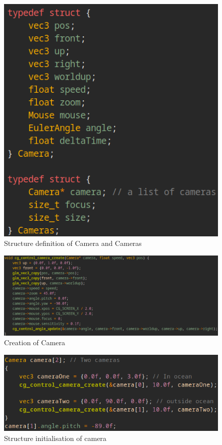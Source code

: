 \documentclass[a4paper, 10pt]{article}
\begin{document}
\begin{figure}[h]
    \centering
    \includegraphics[scale=0.8]{images/camera-struct}
    \caption{Structure definition of Camera and Cameras}
    \label{fig:camera-struct}
\end{figure}

\begin{figure}[h]
    \centering
    \includegraphics[scale=0.5]{images/camera-create-2}
    \caption{Creation of Camera}
    \label{fig:camera-create-2}
\end{figure}

\begin{figure}[h]
    \centering
    \includegraphics[scale=0.9]{images/camera-create}
    \caption{Structure initialisation of camera}
    \label{fig:camera-create-2}
\end{figure}
\end{document}
